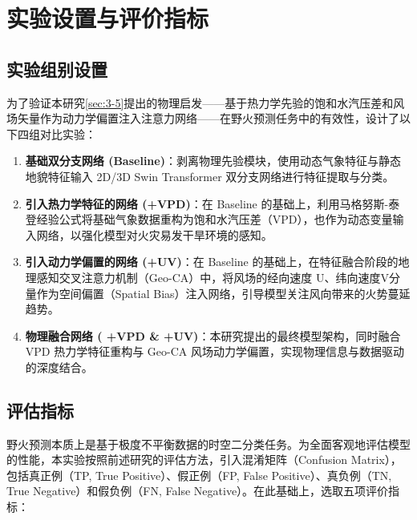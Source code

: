 \section{实验设置与评价指标}
\label{sec:4-2}

\subsection{实验组别设置}
为了验证本研究\ref{sec:3-5}提出的物理启发——基于热力学先验的饱和水汽压差和风场矢量作为动力学偏置注入注意力网络——在野火预测任务中的有效性，设计了以下四组对比实验：

\begin{enumerate}
    \item[(1)] \textbf{基础双分支网络 (Baseline)}：剥离物理先验模块，使用动态气象特征与静态地貌特征输入 2D/3D Swin Transformer 双分支网络进行特征提取与分类。
    \item[(2)] \textbf{引入热力学特征的网络 (+VPD)}：在 Baseline 的基础上，利用马格努斯-泰登经验公式将基础气象数据重构为饱和水汽压差（VPD），也作为动态变量输入网络，以强化模型对火灾易发干旱环境的感知。
    \item[(3)] \textbf{引入动力学偏置的网络 (+UV)}：在 Baseline 的基础上，在特征融合阶段的地理感知交叉注意力机制（Geo-CA）中，将风场的经向速度 U、纬向速度V分量作为空间偏置（Spatial Bias）注入网络，引导模型关注风向带来的火势蔓延趋势。
    \item[(4)] \textbf{物理融合网络 ( +VPD \& +UV)}：本研究提出的最终模型架构，同时融合 VPD 热力学特征重构与 Geo-CA 风场动力学偏置，实现物理信息与数据驱动的深度结合。
\end{enumerate}
\subsection{评估指标}
野火预测本质上是基于极度不平衡数据的时空二分类任务。为全面客观地评估模型的性能，本实验按照前述研究的评估方法\cite{loan,dacsa,kondylatos2022wildfire}，引入混淆矩阵（Confusion Matrix），包括真正例（TP, True Positive）、假正例（FP, False Positive）、真负例（TN, True Negative）和假负例（FN, False Negative）。在此基础上，选取五项评价指标：

